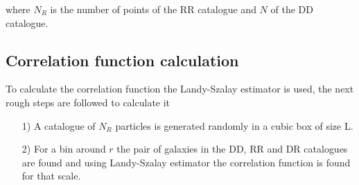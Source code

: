 where $N_R$ is the number of points of the RR catalogue and $N$ of the DD catalogue.

\subsection{Correlation function calculation}

To calculate the correlation function the Landy-Szalay estimator is used, the next
rough steps are followed to calculate it

\begin{enumerate}

\item[1)] A catalogue of $N_R$ particles is generated randomly in a cubic box of size L.

\item[2)] For a bin around $r$ the pair of galaxies in the DD, RR and DR catalogues are found
and using Landy-Szalay estimator the correlation function is found for that scale. 

\end{enumerate}